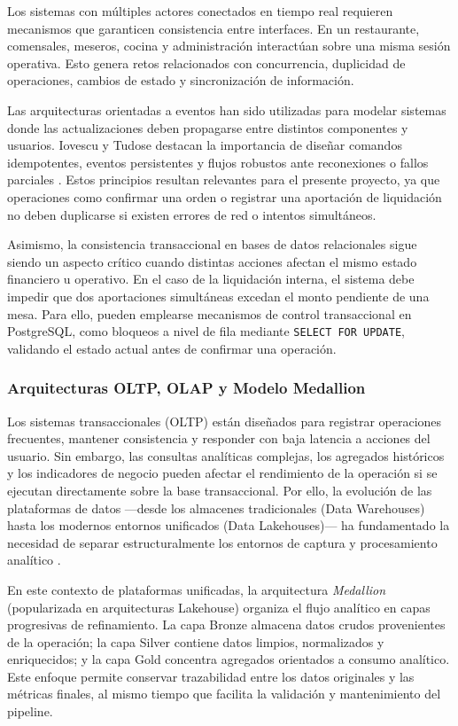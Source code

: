 Los sistemas con m\'ultiples actores conectados en tiempo real requieren mecanismos que
garanticen consistencia entre interfaces. En un restaurante, comensales, meseros, cocina
y administraci\'on interact\'uan sobre una misma sesi\'on operativa. Esto genera retos
relacionados con concurrencia, duplicidad de operaciones, cambios de estado y
sincronizaci\'on de informaci\'on.

Las arquitecturas orientadas a eventos han sido utilizadas para modelar sistemas donde
las actualizaciones deben propagarse entre distintos componentes y usuarios. Iovescu y
Tudose destacan la importancia de dise\~nar comandos idempotentes, eventos persistentes y
flujos robustos ante reconexiones o fallos parciales \cite{iovescu_realtime_2024}. Estos
principios resultan relevantes para el presente proyecto, ya que operaciones como
confirmar una orden o registrar una aportaci\'on de liquidaci\'on no deben duplicarse si
existen errores de red o intentos simult\'aneos.

Asimismo, la consistencia transaccional en bases de datos relacionales sigue siendo un
aspecto cr\'itico cuando distintas acciones afectan el mismo estado financiero u operativo.
En el caso de la liquidaci\'on interna, el sistema debe impedir que dos aportaciones
simult\'aneas excedan el monto pendiente de una mesa. Para ello, pueden emplearse mecanismos
de control transaccional en PostgreSQL, como bloqueos a nivel de fila mediante
\texttt{SELECT FOR UPDATE}, validando el estado actual antes de confirmar una operaci\'on.

\subsubsection{Arquitecturas OLTP, OLAP y Modelo Medallion}

Los sistemas transaccionales (OLTP) est\'an dise\~nados para registrar operaciones frecuentes,
mantener consistencia y responder con baja latencia a acciones del usuario. Sin embargo,
las consultas anal\'iticas complejas, los agregados hist\'oricos y los indicadores de negocio
pueden afectar el rendimiento de la operaci\'on si se ejecutan directamente sobre la base
transaccional. Por ello, la evoluci\'on de las plataformas de datos ---desde los almacenes tradicionales (Data Warehouses) hasta los modernos entornos unificados (Data Lakehouses)--- ha fundamentado la necesidad de separar estructuralmente los entornos de captura y procesamiento anal\'itico \cite{armbrust2021lakehouse}.

En este contexto de plataformas unificadas, la arquitectura \textit{Medallion} (popularizada en arquitecturas Lakehouse) organiza el flujo anal\'itico en capas
progresivas de refinamiento. La capa Bronze almacena datos crudos provenientes de la
operaci\'on; la capa Silver contiene datos limpios, normalizados y enriquecidos; y la capa
Gold concentra agregados orientados a consumo anal\'itico. Este enfoque permite conservar
trazabilidad entre los datos originales y las m\'etricas finales, al mismo tiempo que
facilita la validaci\'on y mantenimiento del pipeline.


